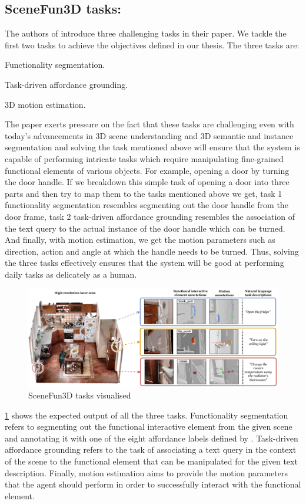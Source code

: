 \subsection{SceneFun3D tasks:}
The authors of \cite{delitzas2024scenefun3d} introduce three challenging tasks in their paper. We tackle the first two tasks to achieve the 
objectives defined in our thesis. The three tasks are:
\begin{compactenum}[1.]
\item	Functionality segmentation.
\item	Task-driven affordance grounding.
\item	3D motion estimation.
\end{compactenum}
The paper exerts pressure on the fact that these tasks are challenging even with today's advancements in 3D scene understanding
and 3D semantic and instance segmentation and solving the task mentioned above will ensure that the system is capable of 
performing intricate tasks which require manipulating fine-grained functional elements of various objects.
For example, opening a door by turning the door handle. If we breakdown this simple task of opening a door into three parts
and then try to map them to the tasks mentioned above we get, task 1 functionality segmentation resembles segmenting out the door handle 
from the door frame, task 2 task-driven affordance grounding resembles the association of the text query to the actual 
instance of the door handle which can be turned. And finally, with motion estimation, we get the motion parameters such as direction, action and angle 
at which the handle needs to be turned. Thus, solving the three tasks effectively ensures that the system will be good at performing daily
tasks as delicately as a human. \\
\begin{figure}[ht!]
    \centering
    \includegraphics[width=\textwidth]{content/images/SceneFun3D.png}
    \caption{SceneFun3D tasks visualised \cite{delitzas2024scenefun3d}}
    \label{fig:your_image_label}
\end{figure}
\cref{fig:your_image_label} shows the expected output of all the three tasks. Functionality segmentation refers to segmenting out the functional interactive 
element from the given scene and annotating it with one of the eight affordance labels defined by \cite{gibson}. Task-driven affordance grounding refers to the task
of associating a text query in the context of the scene to the functional element that can be manipulated for the given text description. Finally, motion estimation
aims to provide the motion parameters that the agent should perform in order to successfully interact with the functional element.

